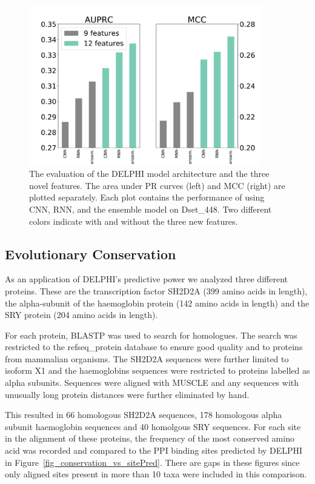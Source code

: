 \begin{figure}
\centering
\includegraphics[width=\columnwidth, height=7cm]{img/CNN_RNN_ensemble.pdf}
  \caption[The evaluation of the DELPHI model architecture and the three novel features.]{The evaluation of the DELPHI model architecture and the three novel features. The area under PR curves (left) and MCC (right) are plotted separately. Each plot contains the performance of using CNN, RNN, and the ensemble model on Dset\_448. Two different colors indicate with and without the three new features.}
  \label{fig_CNN_RNN_ensemble}
\end{figure}

\subsection{\textcolor{\mySecondColor}{Evolutionary Conservation}}

\textcolor{\mySecondColor}{As an application of DELPHI's predictive power we analyzed three different proteins.  These are the transcription factor SH2D2A (399 amino acids in length), the alpha-subunit of the haemoglobin protein (142 amino acids in length) and the SRY protein (204 amino acids
in length).}

\textcolor{\mySecondColor}{For each protein, BLASTP was used to search for homologues.  The search was restricted to the refseq\_protein database to ensure good quality and
to proteins from mammalian organisms.  The SH2D2A sequences were further
limited to isoform X1 and the haemoglobins sequences were restricted to
proteins labelled as alpha subunits.  Sequences were aligned with MUSCLE
\cite{edgar2004muscle} and any sequences with unusually long protein distances
were further eliminated by hand.}

\textcolor{\mySecondColor}{This resulted in 66 homologous SH2D2A sequences, 178 homologous alpha
subunit haemoglobin sequences and 40 homolgous SRY sequences.  For each
site in the alignment of these proteins, the frequency of the most
conserved amino acid was recorded and compared to the PPI binding sites predicted by
DELPHI in Figure~\ref{fig_conservation_vs_sitePred}.  There are gaps in these figures since only aligned
sites present in more than 10 taxa were included in this comparison.}

